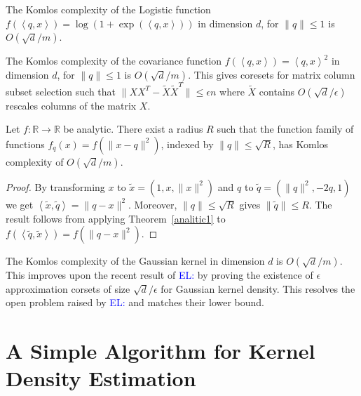 \documentclass[anon,12pt]{colt2019} %
\newcommand{\el}[1]{\textcolor{blue}{EL: #1}}
\newcommand{\ip}[1]{\left \langle #1 \right \rangle}
\newcommand{\R}{\mathbb{R}}
\newcommand{\eps}{\epsilon}
\begin{document}
\begin{corollary}
The Komlos complexity of the Logistic function $f(\ip{q,x}) = \log(1+\exp(\ip{q,x}))$ in dimension $d$, for $\|q\| \leq 1$ is $O(\sqrt{d}/m)$.
\end{corollary}

\begin{corollary}
The Komlos complexity of the covariance function $f(\ip{q,x}) = \ip{q,x}^2$ in dimension $d$, for $\|q\| \leq 1$ is $O(\sqrt{d}/m)$. This gives coresets for matrix column subset selection such that $\|XX^T - \tilde X \tilde X^T\| \le \eps n$ where $\tilde X$ contains $O(\sqrt{d}/\eps)$ rescales columns of the matrix $X$.
\end{corollary}



\begin{theorem}
Let $f:\R\rightarrow\R$ be analytic. There exist a radius $R$ such that the function family of functions $f_q(x) = f(\|x-q\|^2)$, indexed by $\|q\| \leq \sqrt{R}$, has Komlos complexity of $O(\sqrt{d}/m)$. 
\end{theorem}
\begin{proof}
By transforming $x$ to $\tilde{x} = (1, x, \|x\|^2)$ and $q$ to $\tilde{q} = (\|q\|^2, -2q, 1)$ we get $\ip{\tilde{x},\tilde{q}} = \|q-x\|^2$. Moreover, $\|q\| \le \sqrt{R}$ gives $\|\tilde q\| \le R$. The result follows from applying Theorem~\ref{analitic1} to $f(\ip{ \tilde q, \tilde x}) = f(\|q-x\|^2)$.
\end{proof}

\begin{corollary}
The Komlos complexity of the Gaussian kernel in dimension $d$ is $O(\sqrt{d}/m)$.
This improves upon the recent result of \el{\cite{??}} by proving the existence of $\eps$ approximation corsets of size $\sqrt{d}/\eps$ for Gaussian kernel density.
This resolves the open problem raised by \el{\cite{??}} and matches their lower bound.   
\end{corollary}


\section{A Simple Algorithm for Kernel Density Estimation}
\end{document}
